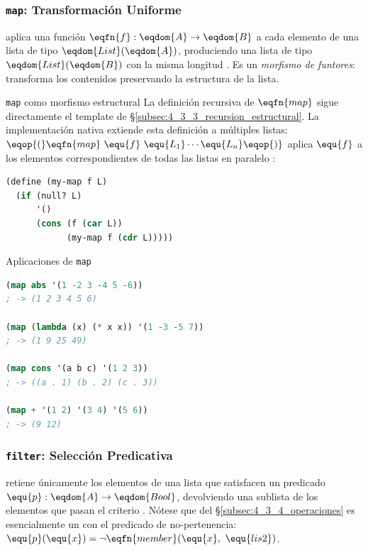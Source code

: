\subsubsection*{\texttt{map}: Transformación Uniforme}

 aplica una función $\eqfn{f} : \eqdom{A} \to \eqdom{B}$ a cada elemento de una lista de tipo $\eqdom{List}(\eqdom{A})$, produciendo una lista de tipo $\eqdom{List}(\eqdom{B})$ con la misma longitud \cite{SICP}. Es un \textit{morfismo de funtores}: transforma los contenidos preservando la estructura de la lista.

\begin{definicion}{\texttt{map} como morfismo estructural}
La definición recursiva de $\eqfn{map}$ sigue directamente el template de §\ref{subsec:4_3_3_recursion_estructural}. La implementación nativa extiende esta definición a múltiples listas: $\eqop{(}\eqfn{map}\ \equ{f}\ \equ{L_1} \cdots \equ{L_n}\eqop{)}$ aplica $\equ{f}$ a los elementos correspondientes de todas las listas en paralelo \cite{SICP}:
\begin{lstlisting}[language=Lisp, caption={Definición recursiva de map}]
(define (my-map f L)
  (if (null? L)
      '()
      (cons (f (car L))
            (my-map f (cdr L)))))
\end{lstlisting}
\end{definicion}

\begin{ejemplo}{Aplicaciones de \texttt{map}}
\begin{lstlisting}[language=Lisp, caption={Uso de map con distintas funciones}]
(map abs '(1 -2 3 -4 5 -6))
; -> (1 2 3 4 5 6)

(map (lambda (x) (* x x)) '(1 -3 -5 7))
; -> (1 9 25 49)

(map cons '(a b c) '(1 2 3))
; -> ((a . 1) (b . 2) (c . 3))

(map + '(1 2) '(3 4) '(5 6))
; -> (9 12)
\end{lstlisting}
\end{ejemplo}

\subsubsection*{\texttt{filter}: Selección Predicativa}

 retiene únicamente los elementos de una lista que satisfacen un predicado $\equ{p} : \eqdom{A} \to \eqdom{Bool}$, devolviendo una sublista de los elementos que pasan el criterio \cite{HtDP}. Nótese que  del §\ref{subsec:4_3_4_operaciones} es esencialmente un  con el predicado de no-pertenencia: $\equ{p}(\equ{x}) = \lnot\eqfn{member}(\equ{x},\ \equ{lis2})$.

